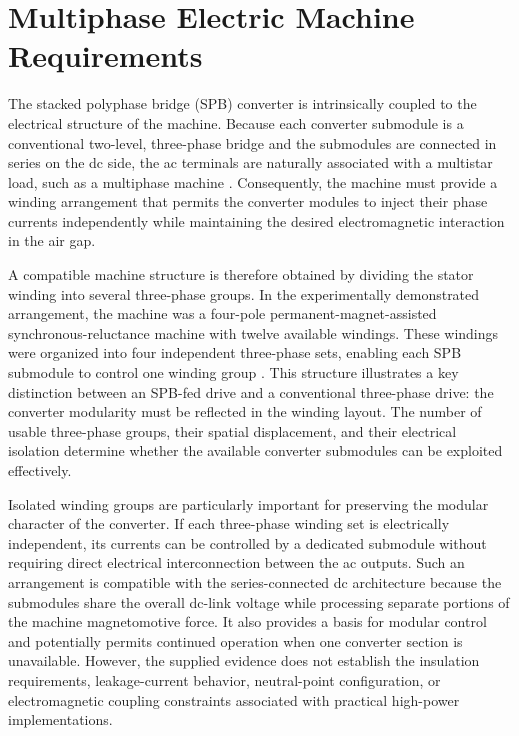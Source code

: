 \section{Multiphase Electric Machine Requirements}

The stacked polyphase bridge (SPB) converter is intrinsically coupled to the electrical structure of the machine. Because each converter submodule is a conventional two-level, three-phase bridge and the submodules are connected in series on the dc side, the ac terminals are naturally associated with a multistar load, such as a multiphase machine \cite{Jin2017}. Consequently, the machine must provide a winding arrangement that permits the converter modules to inject their phase currents independently while maintaining the desired electromagnetic interaction in the air gap.

A compatible machine structure is therefore obtained by dividing the stator winding into several three-phase groups. In the experimentally demonstrated arrangement, the machine was a four-pole permanent-magnet-assisted synchronous-reluctance machine with twelve available windings. These windings were organized into four independent three-phase sets, enabling each SPB submodule to control one winding group \cite{Jin2017}. This structure illustrates a key distinction between an SPB-fed drive and a conventional three-phase drive: the converter modularity must be reflected in the winding layout. The number of usable three-phase groups, their spatial displacement, and their electrical isolation determine whether the available converter submodules can be exploited effectively.

Isolated winding groups are particularly important for preserving the modular character of the converter. If each three-phase winding set is electrically independent, its currents can be controlled by a dedicated submodule without requiring direct electrical interconnection between the ac outputs. Such an arrangement is compatible with the series-connected dc architecture because the submodules share the overall dc-link voltage while processing separate portions of the machine magnetomotive force. It also provides a basis for modular control and potentially permits continued operation when one converter section is unavailable. However, the supplied evidence does not establish the insulation requirements, leakage-current behavior, neutral-point configuration, or electromagnetic coupling constraints associated with practical high-power implementations. %

